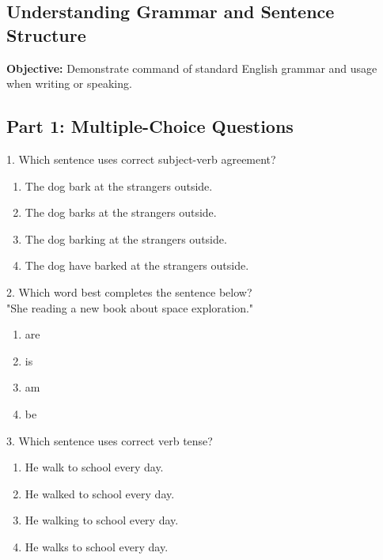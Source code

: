 \documentclass[12pt]{article}
\begin{document}
\subsection*{Understanding Grammar and Sentence Structure}
\onehalfspacing

\begin{tcolorbox}[colframe=black!40, colback=gray!0, title=Learning Objective]
\textbf{Objective:} Demonstrate command of standard English grammar and usage when writing or speaking.
\end{tcolorbox}

\subsection*{Part 1: Multiple-Choice Questions}

1. Which sentence uses correct subject-verb agreement?\\
\begin{enumerate}[label=\Alph*.]
    \item The dog bark at the strangers outside.  
    \item The dog barks at the strangers outside.  
    \item The dog barking at the strangers outside.  
    \item The dog have barked at the strangers outside.  
\end{enumerate}

\vspace{1cm}

2. Which word best completes the sentence below?\\
"She \underline{\hspace{1cm}} reading a new book about space exploration."\\
\begin{enumerate}[label=\Alph*.]
    \item are  
    \item is  
    \item am  
    \item be  
\end{enumerate}

\vspace{1cm}

3. Which sentence uses correct verb tense?\\
\begin{enumerate}[label=\Alph*.]
    \item He walk to school every day.  
    \item He walked to school every day.  
    \item He walking to school every day.  
    \item He walks to school every day.  
\end{enumerate}
\end{document}
